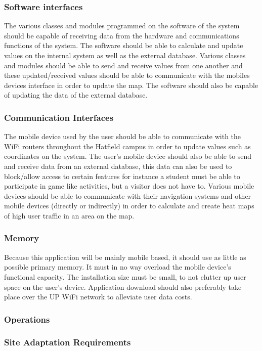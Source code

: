 \documentclass[a4paper,12pt]{article}
\begin{document}
\subsubsection{Software interfaces}
The various classes and modules programmed on the software of the system should be capable of receiving data from the hardware and communications functions of the system. The software should be able to calculate and update values on the internal system as well as the external database. Various classes and modules should be able to send and receive values from one another and these updated/received values should be able to communicate with the mobiles devices interface in order to update the map. The software should also be capable of updating the data of the external database.\\
\subsubsection{Communication Interfaces}
The mobile device used by the user should be able to communicate with the WiFi routers throughout the Hatfield campus in order to update values such as coordinates on the system. The user’s mobile device should also be able to send and receive data from an external database, this data can also be used to block/allow access to certain features for instance a student must be able to participate in game like activities, but a visitor does not have to. Various mobile devices should be able to communicate with their navigation systems and other mobile devices (directly or indirectly) in order to calculate and create heat maps of high user traffic in an area on the map.\\
\subsubsection{Memory}
Because this application will be mainly mobile based, it should use as little as possible primary memory. It must in no way overload the mobile device's functional capacity. The installation size must be small, to not clutter up user space on the user's device. Application download should also preferably take place over the UP WiFi network to alleviate user data costs.
\subsubsection{Operations}
\subsubsection{Site Adaptation Requirements}
\end{document}
